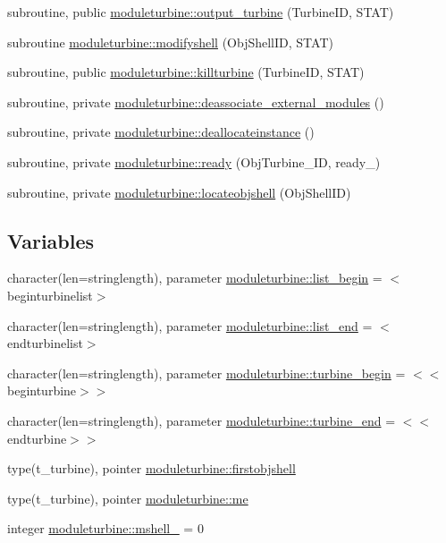 \begin{DoxyCompactItemize}
\item 
subroutine, public \mbox{\hyperlink{namespacemoduleturbine_ab12d2233fd93cc941831900a0b5713c9}{moduleturbine\+::output\+\_\+turbine}} (Turbine\+ID, S\+T\+AT)
\item 
subroutine \mbox{\hyperlink{namespacemoduleturbine_a1d4106d55d966d87476e3ddbb2fc33b0}{moduleturbine\+::modifyshell}} (Obj\+Shell\+ID, S\+T\+AT)
\item 
subroutine, public \mbox{\hyperlink{namespacemoduleturbine_a14dcb5e2f0dfed8ce2da9616f01b2a58}{moduleturbine\+::killturbine}} (Turbine\+ID, S\+T\+AT)
\item 
subroutine, private \mbox{\hyperlink{namespacemoduleturbine_a9ba3c2694581c5c8d730d5cacd9c2a61}{moduleturbine\+::deassociate\+\_\+external\+\_\+modules}} ()
\item 
subroutine, private \mbox{\hyperlink{namespacemoduleturbine_af2af37c97b47092470d2bf90bd9bc56e}{moduleturbine\+::deallocateinstance}} ()
\item 
subroutine, private \mbox{\hyperlink{namespacemoduleturbine_a05e91853a3be1ed656ff05d69618a83d}{moduleturbine\+::ready}} (Obj\+Turbine\+\_\+\+ID, ready\+\_\+)
\item 
subroutine, private \mbox{\hyperlink{namespacemoduleturbine_ad69845ea1216f04acc515267e6a71770}{moduleturbine\+::locateobjshell}} (Obj\+Shell\+ID)
\end{DoxyCompactItemize}
\subsection*{Variables}
\begin{DoxyCompactItemize}
\item 
character(len=stringlength), parameter \mbox{\hyperlink{namespacemoduleturbine_ad04636802bac2f3c19dff855eca9c9dc}{moduleturbine\+::list\+\_\+begin}} = \textquotesingle{}$<$beginturbinelist$>$\textquotesingle{}
\item 
character(len=stringlength), parameter \mbox{\hyperlink{namespacemoduleturbine_a9c4747fd12e7bf415c89aca4386a391e}{moduleturbine\+::list\+\_\+end}} = \textquotesingle{}$<$endturbinelist$>$\textquotesingle{}
\item 
character(len=stringlength), parameter \mbox{\hyperlink{namespacemoduleturbine_a62168195f6951bb643ae2ea10c2b04c8}{moduleturbine\+::turbine\+\_\+begin}} = \textquotesingle{}$<$$<$beginturbine$>$$>$\textquotesingle{}
\item 
character(len=stringlength), parameter \mbox{\hyperlink{namespacemoduleturbine_acd41e1d7b88aa9d9d9ecdbf51a563711}{moduleturbine\+::turbine\+\_\+end}} = \textquotesingle{}$<$$<$endturbine$>$$>$\textquotesingle{}
\item 
type(t\+\_\+turbine), pointer \mbox{\hyperlink{namespacemoduleturbine_a858f94cb0c630187cc84a6e706f9ac32}{moduleturbine\+::firstobjshell}}
\item 
type(t\+\_\+turbine), pointer \mbox{\hyperlink{namespacemoduleturbine_a49ad1250ab40f9f964278793bcff42e0}{moduleturbine\+::me}}
\item 
integer \mbox{\hyperlink{namespacemoduleturbine_a6ecd7a89c88a447b97a33fcfc0a731a7}{moduleturbine\+::mshell\+\_\+}} = 0
\end{DoxyCompactItemize}
